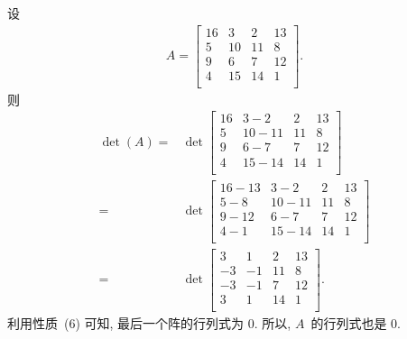 \documentclass[%
    UTF8,%
    fontset=none,%
    punct=kaiming,%
    zihao=-4,%
    a4paper,%
    oneside,%
]{ctexbook}
\begin{document}
\begin{example}
    设
    \begin{align*}
        A = \begin{bmatrix}
                16 & 3  & 2  & 13 \\
                5  & 10 & 11 & 8  \\
                9  & 6  & 7  & 12 \\
                4  & 15 & 14 & 1  \\
            \end{bmatrix}.
    \end{align*}
    则
    \begin{align*}
        \det {(A)}
        = {} &
        \det {
            \begin{bmatrix}
                16 & 3 - 2   & 2  & 13 \\
                5  & 10 - 11 & 11 & 8  \\
                9  & 6 - 7   & 7  & 12 \\
                4  & 15 - 14 & 14 & 1  \\
            \end{bmatrix}
        }
        \\
        = {} &
        \det {
            \begin{bmatrix}
                16 - 13 & 3 - 2   & 2  & 13 \\
                5 - 8   & 10 - 11 & 11 & 8  \\
                9 - 12  & 6 - 7   & 7  & 12 \\
                4 - 1   & 15 - 14 & 14 & 1  \\
            \end{bmatrix}
        }
        \\
        = {} &
        \det {
            \begin{bmatrix}
                3  & 1  & 2  & 13 \\
                -3 & -1 & 11 & 8  \\
                -3 & -1 & 7  & 12 \\
                3  & 1  & 14 & 1  \\
            \end{bmatrix}
        }.
    \end{align*}
    利用性质~(6) 可知, 最后一个阵的行列式为 \(0\).
    所以, \(A\)~的行列式也是 \(0\).


\end{example}
\end{document}
